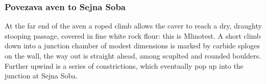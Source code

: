 \hypertarget{povezava-aven-to-sejna-soba}{%
\subsubsection{Povezava aven to Sejna Soba}\label{povezava-aven-to-sejna-soba}}

At the far end of the aven a roped climb allows the caver to reach a dry, draughty stooping passage, covered in fine white rock flour: this is Mlinotest. A short climb down into a junction chamber of modest dimensions is marked by carbide sploges on the wall, the way out is straight ahead, among scuplted and rounded boulders. Further upwind is a series of constrictions, which eventually pop up into the junction at Sejna Soba.
